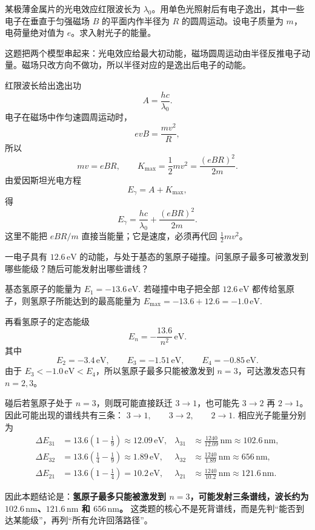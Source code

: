 \documentclass[lang=cn,11pt]{elegantbook}
\begin{document}
\begin{exercise}
某极薄金属片的光电效应红限波长为 \(\lambda_0\)。用单色光照射后有电子逸出，其中一些电子在垂直于匀强磁场 \(B\) 的平面内作半径为 \(R\) 的圆周运动。设电子质量为 \(m\)，电荷量绝对值为 \(e\)。求入射光子的能量。
\end{exercise}

\begin{solution}
这题把两个模型串起来：光电效应给最大初动能，磁场圆周运动由半径反推电子动量。磁场只改方向不做功，所以半径对应的是逸出后电子的动能。

红限波长给出逸出功
\[
A=\frac{hc}{\lambda_0}.
\]
电子在磁场中作匀速圆周运动时，
\[
e v B=\frac{mv^2}{R},
\]
所以
\[
mv=eBR,\qquad
K_{\max}=\frac{1}{2}mv^2
=\frac{(eBR)^2}{2m}.
\]
由爱因斯坦光电方程
\[
E_\gamma=A+K_{\max},
\]
得
\[
\boxed{
E_\gamma=\frac{hc}{\lambda_0}
+\frac{(eBR)^2}{2m}
}.
\]
这里不能把 \(eBR/m\) 直接当能量；它是速度，必须再代回 \(\frac12mv^2\)。
\end{solution}

\begin{exercise}[12.6\,eV 电子轰击基态氢原子时会出现哪些谱线]
一电子具有 \(12.6\,\mathrm{eV}\) 的动能，与处于基态的氢原子碰撞。问氢原子最多可被激发到哪些能级？随后可能发射出哪些谱线？
\end{exercise}

\begin{solution}
基态氢原子的能量为
 \(E_1=-13.6\,\mathrm{eV}.\) 
若碰撞中电子把全部 \(12.6\,\mathrm{eV}\) 都传给氢原子，则氢原子所能达到的最高能量为
 \(E_{\max}=-13.6+12.6=-1.0\,\mathrm{eV}.\) 

再看氢原子的定态能级
\[
E_n=-\frac{13.6}{n^2}\,\mathrm{eV}.
\]
其中
\[
E_2=-3.4\,\mathrm{eV},\qquad
E_3=-1.51\,\mathrm{eV},\qquad
E_4=-0.85\,\mathrm{eV}.
\]
由于 \(E_3<-1.0\,\mathrm{eV}<E_4\)，所以氢原子最多只能被激发到 \(n=3\)，可达激发态只有 \(n=2,3\)。

碰后若氢原子处于 \(n=3\)，则既可能直接跃迁 \(3\to 1\)，也可能先 \(3\to 2\) 再 \(2\to 1\)。因此可能出现的谱线共有三条：
 \(3\to 1,\qquad 3\to 2,\qquad 2\to 1.\) 
相应光子能量分别为
\[
\begin{aligned}
\Delta E_{31}&=13.6\left(1-\frac19\right)\approx 12.09\,\mathrm{eV},
&\lambda_{31}&\approx \frac{1240}{12.09}\,\mathrm{nm}\approx 102.6\,\mathrm{nm},\\
\Delta E_{32}&=13.6\left(\frac14-\frac19\right)\approx 1.89\,\mathrm{eV},
&\lambda_{32}&\approx \frac{1240}{1.89}\,\mathrm{nm}\approx 656\,\mathrm{nm},\\
\Delta E_{21}&=13.6\left(1-\frac14\right)=10.2\,\mathrm{eV},
&\lambda_{21}&\approx \frac{1240}{10.2}\,\mathrm{nm}\approx 121.6\,\mathrm{nm}.
\end{aligned}
\]

因此本题结论是：\textbf{氢原子最多只能被激发到 \(n=3\)，可能发射三条谱线，波长约为 \(102.6\,\mathrm{nm}\)、\(121.6\,\mathrm{nm}\) 和 \(656\,\mathrm{nm}\)。} 这类题的核心不是死背谱线，而是先判“能否到达某能级”，再列“所有允许回落路径”。
\end{solution}
\end{document}
